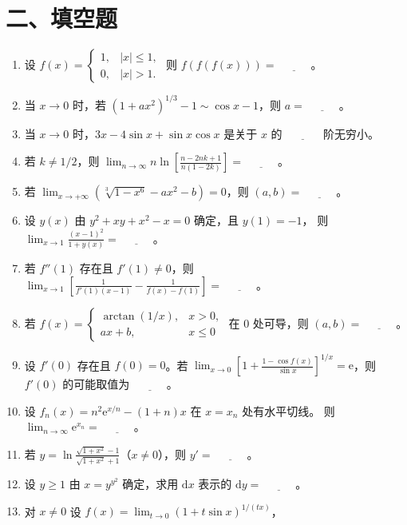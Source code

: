 \documentclass[UTF8,a4paper,zihao=-4,fontset=fandol]{ctexart}
\newcommand{\blank}{\underline{\hspace{3em}}}
\begin{document}
\section*{二、填空题}
\begin{enumerate}[start=22]
\item 设 $f(x)=\begin{cases}1,&|x|\le1,\\0,&|x|>1.\end{cases}$ 则 $f(f(f(x)))=\blank$。
\item 当 $x\to0$ 时，若 $(1+ax^2)^{1/3}-1\sim\cos x-1$，则 $a=\blank$。
\item 当 $x\to0$ 时，$3x-4\sin x+\sin x\cos x$ 是关于 $x$ 的 $\blank$ 阶无穷小。
\item 若 $k\ne1/2$，则 $\displaystyle\lim_{n\to\infty}
  n\ln\left[\frac{n-2nk+1}{n(1-2k)}\right]=\blank$。
\item 若 $\displaystyle\lim_{x\to+\infty}(\sqrt[3]{1-x^6}-ax^2-b)=0$，则 $(a,b)=\blank$。
\item 设 $y(x)$ 由 $y^2+xy+x^2-x=0$ 确定，且 $y(1)=-1$，
则 $\displaystyle\lim_{x\to1}\frac{(x-1)^2}{1+y(x)}=\blank$。
\item 若 $f''(1)$ 存在且 $f'(1)\ne0$，则 $\displaystyle\lim_{x\to1}
\left[\frac1{f'(1)(x-1)}-\frac1{f(x)-f(1)}\right]=\blank$。
\item 若 $f(x)=\begin{cases}\arctan(1/x),&x>0,\\ax+b,&x\le0\end{cases}$
在 $0$ 处可导，则 $(a,b)=\blank$。
\item 设 $f'(0)$ 存在且 $f(0)=0$。若 $\displaystyle\lim_{x\to0}
\left[1+\frac{1-\cos f(x)}{\sin x}\right]^{1/x}=\mathrm e$，则 $f'(0)$ 的可能取值为 $\blank$。
\item 设 $f_n(x)=n^2\mathrm{e}^{x/n}-(1+n)x$ 在 $x=x_n$ 处有水平切线。
则 $\displaystyle\lim_{n\to\infty}\mathrm{e}^{x_n}=\blank$。
\item 若 $\displaystyle y=\ln\frac{\sqrt{1+x^2}-1}{\sqrt{1+x^2}+1}$（$x\ne0$），则 $y'=\blank$。
\item 设 $y\ge1$ 由 $x=y^{y^2}$ 确定，求用 $\mathrm{d}x$ 表示的 $\mathrm{d}y=\blank$。
\item 对 $x\ne0$ 设 $\displaystyle f(x)=\lim_{t\to0}(1+t\sin x)^{1/(tx)}$，

\end{enumerate}
\end{document}

